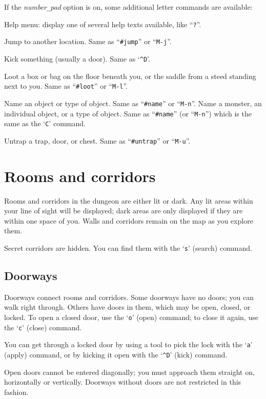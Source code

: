 \nd If the {\it number\verb+_+pad\/} option is on, some additional letter commands
are available:
\blist{}
\item[\tb{h}]
Help menu:  display one of several help texts available, like ``{\tt ?}''.
\item[\tb{j}]
Jump to another location.  Same as ``{\tt \#jump}'' or ``{\tt M-j}''.
\item[\tb{k}]
Kick something (usually a door).  Same as `{\tt \^{}D}'.
\item[\tb{l}]
Loot a box or bag on the floor beneath you, or the saddle 
from a steed standing next to you.  Same as ``{\tt \#loot}'' or ``{\tt M-l}''.
\item[\tb{N}]
Name an object or type of object.  Same as ``{\tt \#name}'' or ``{\tt M-n}''.
Name a monster, an individual object, or a type of object.  Same
as ``{\tt \#name}'' (or ``{\tt M-n}'') which is the same as the `{\tt C}'
command.
\item[\tb{u}]
Untrap a trap, door, or chest.  Same as ``{\tt \#untrap}'' or ``{\tt M-u}''.
\elist

\section{Rooms and corridors}

Rooms and corridors in the dungeon are either lit or dark.
Any lit areas within your line of sight will be displayed;
dark areas are only displayed if they are within one space of you. 
Walls and corridors remain on the map as you explore them.

Secret corridors are hidden.  You can find them with the `{\tt s}' (search)
command.

\subsection*{Doorways}

Doorways connect rooms and corridors.  Some doorways have no doors;
you can walk right through.  Others have doors in them, which may be
open, closed, or locked.  To open a closed door, use the `{\tt o}' (open)
command; to close it again, use the `{\tt c}' (close) command.

You can get through a locked door by using a tool to pick the lock
with the `{\tt a}' (apply) command, or by kicking it open with the
`{\tt \^{}D}' (kick) command.

Open doors cannot be entered diagonally; you must approach them
straight on, horizontally or vertically.  Doorways without doors are
not restricted in this fashion.

